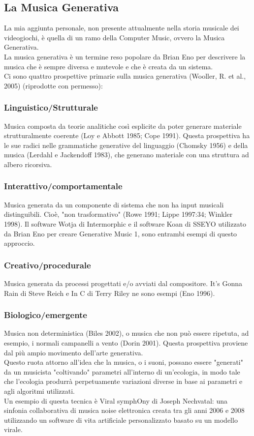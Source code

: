  \subsection*{La Musica Generativa}
 La mia aggiunta personale, non presente attualmente nella storia musicale dei videogiochi, è quella di un ramo della Computer Music,
 ovvero la Musica Generativa.\\
 La musica generativa è un termine reso popolare da Brian Eno per descrivere la musica che è sempre diversa e mutevole e che è creata da un sistema.\\
 Ci sono quattro prospettive primarie sulla musica generativa (Wooller, R. et al., 2005) (riprodotte con permesso):

 \subsubsection*{Linguistico/Strutturale}

 Musica composta da teorie analitiche così esplicite da poter generare materiale strutturalmente coerente (Loy e Abbott 1985; Cope 1991).
 Questa prospettiva ha le sue radici nelle grammatiche generative del linguaggio (Chomsky 1956) e della musica (Lerdahl e Jackendoff 1983), che generano materiale con una struttura ad albero ricorsiva.
 
\subsubsection*{Interattivo/comportamentale}
Musica generata da un componente di sistema che non ha input musicali distinguibili. Cioè, "non trasformativo" (Rowe 1991; Lippe 1997:34; Winkler 1998).
 Il software Wotja di Intermorphic e il software Koan di SSEYO utilizzato da Brian Eno per creare Generative Music 1, sono entrambi esempi di questo approccio.

 \subsubsection*{Creativo/procedurale}
 Musica generata da processi progettati e/o avviati dal compositore. It's Gonna Rain di Steve Reich e In C di Terry Riley ne sono esempi (Eno 1996).

 \subsubsection*{Biologico/emergente}
 Musica non deterministica (Biles 2002), o musica che non può essere ripetuta, ad esempio, i normali campanelli a vento (Dorin 2001). Questa prospettiva proviene dal più ampio movimento dell'arte generativa.\\
 Questo ruota attorno all'idea che la musica, o i suoni, possano essere "generati" da un musicista "coltivando" parametri all'interno di un'ecologia, in modo tale che l'ecologia produrrà perpetuamente variazioni diverse in base ai parametri e agli algoritmi utilizzati.\\ 
 Un esempio di questa tecnica è Viral symphOny di Joseph Nechvatal: una sinfonia collaborativa di musica noise elettronica creata tra gli anni 2006 e 2008 utilizzando un software di vita artificiale personalizzato basato su un modello virale.

